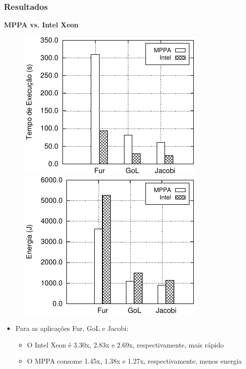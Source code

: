 \documentclass[xcolor={table}]{beamer}
\begin{document}
\begin{frame}\frametitle{Resultados}
    \textbf{MPPA vs. Intel Xeon}
    \begin{figure}

        \centering
        \includegraphics[width=.49\textwidth]{figs/ComparisonTimeTiles10.pdf}
        \includegraphics[width=.49\textwidth]{figs/9.pdf}

    \end{figure}
    \begin{itemize}
    \item Para as aplicações Fur, GoL e Jacobi:
    \begin{itemize}
    \item O Intel Xeon é 3.30x, 2.83x e 2.69x, respectivamente, mais rápido
    \item O MPPA consome 1.45x, 1.38x e 1.27x, respectivamente, menos energia
    \end{itemize}
    \end{itemize}


\end{frame}
\end{document}
